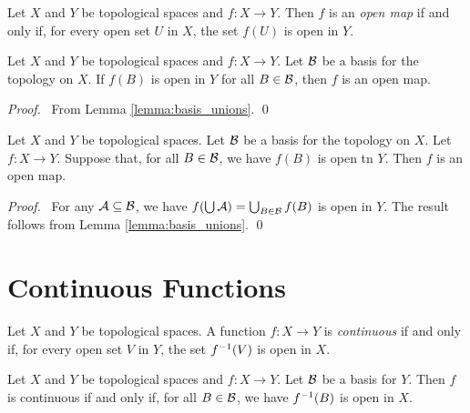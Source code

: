 \begin{definition}
    Let $X$ and $Y$ be topological spaces and $f : X \rightarrow Y$. Then $f$ is an \emph{open map} if and
    only if, for every open set $U$ in $X$, the set $f(U)$ is open in $Y$.
\end{definition}

\begin{lemma}
    \label{lemma:open_map_basis}
    Let $X$ and $Y$ be topological spaces and $f : X \rightarrow Y$. Let $\mathcal{B}$ be a basis for the topology on $X$.
    If $f(B)$ is open in $Y$ for all $B \in \mathcal{B}$, then $f$ is an open map.
\end{lemma}

\begin{proof}
    \pf\ From Lemma \ref{lemma:basis_unions}. \qed
\end{proof}

\begin{proposition}
    \label{proposition:open_map_basis}
    Let $X$ and $Y$ be topological spaces. Let $\mathcal{B}$ be a basis for the topology on $X$.
    Let $f : X \rightarrow Y$. Suppose that, for all $B \in \mathcal{B}$, we have $f(B)$
    is open tn $Y$. Then $f$ is an open map.
\end{proposition}

\begin{proof}
    \pf\ For any $\mathcal{A} \subseteq \mathcal{B}$, we have $f(\bigcup \mathcal{A}) = \bigcup_{B \in \mathcal{B}} f(B)$
    is open in $Y$. The result follows from Lemma \ref{lemma:basis_unions}. \qed
\end{proof}

\section{Continuous Functions}

\begin{definition}[Continuous]
    Let $X$ and $Y$ be topological spaces. A function $f : X \rightarrow Y$ is \emph{continuous} if and only
    if, for every open set $V$ in $Y$, the set ${f}^{-1}(V)$ is open in $X$.
\end{definition}

\begin{proposition}
    \label{proposition:continuous_basis}
    Let $X$ and $Y$ be topological spaces and $f : X \rightarrow Y$. Let $\mathcal{B}$ be a basis for $Y$. Then $f$
    is continuous if and only if, for all $B \in \mathcal{B}$, we have ${f}^{-1}(B)$ is open in $X$.
\end{proposition}

